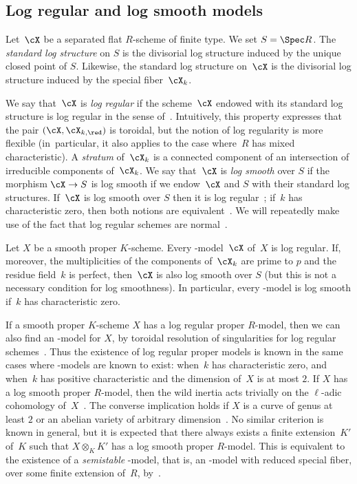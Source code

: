 \subsection{Log regular and log smooth models}
Let~$\cX$ be a separated flat $R$\nobreakdash-scheme of finite type. We set $S=\Spec R$. The {\em standard log structure} on $S$ is the divisorial log structure induced by the unique closed point of $S$. Likewise, the standard log structure on~$\cX$ is the divisorial log structure induced by the special fiber~$\cX_k$.

We say that~$\cX$ is {\em log regular} if the scheme~$\cX$ endowed with its standard log structure
is log regular in the sense of~\cite{kato}. Intuitively, this property expresses that the pair $(\cX,\cX_{k,\red})$ is toroidal, but the notion of log regularity is more flexible (in~particular, it also applies to the case where~$R$ has mixed characteristic). A {\em stratum} of~$\cX_k$ is a connected component of an intersection of irreducible components of~$\cX_k$.
We say that~$\cX$ is {\em log smooth} over $S$ if the morphism $\cX\to S$ is log smooth if we endow~$\cX$ and
$S$ with their standard log structures.
If~$\cX$ is log smooth over $S$ then it is log regular~\cite[8.2]{kato}; if~$k$ has characteristic zero, then both notions are equivalent~\cite[3.6.1]{logzeta}.
We will repeatedly make use of the fact that log regular schemes are normal~\cite[4.1]{kato}.

\begin{example}
Let $X$ be a smooth proper $K$\nobreakdash-scheme. Every \snc-model~$\cX$ of~$X$ is log regular. If, moreover, the multiplicities of the components of~$\cX_k$ are prime to $p$ and the residue field~$k$ is perfect, then~$\cX$ is also log smooth over $S$ (but this is not a necessary condition for log smoothness). In particular, every \snc-model is log smooth if~$k$ has characteristic zero.
\end{example}

If a smooth proper $K$\nobreakdash-scheme $X$ has a log regular proper $R$\nobreakdash-model, then we can also find an \snc-model for $X$, by toroidal resolution of singularities for log regular schemes~\cite{kato}.
Thus the existence of log regular proper models is known in the same cases where \snc-models are known to exist: when~$k$ has characteristic zero, and when~$k$ has positive characteristic and the dimension of~$X$ is at most $2$.
If $X$ has a log smooth proper $R$\nobreakdash-model, then the wild inertia acts trivially on the $\ell$-adic cohomology of~$X$~\cite[0.1.1]{nakayama-nearby}.
The converse implication holds if $X$ is a curve of genus at least $2$ or an abelian variety of arbitrary dimension~\cite{saito-sstable, stix, bellardini-smeets}. No similar criterion is known in general, but it is expected that there always exists a finite extension~$K'$ of~$K$ such that $X\otimes_K K'$ has a log smooth proper $R$\nobreakdash-model. This is equivalent to the existence of a {\em semistable} \snc-model, that is, an \snc-model with reduced special fiber, over some finite extension of~$R$, by~\cite{saito-sstable}.

